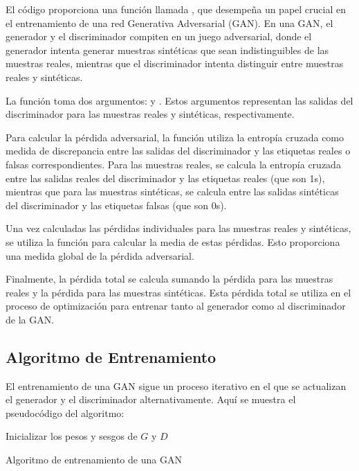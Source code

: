 El código proporciona una función llamada , que desempeña un papel crucial en el entrenamiento de una red Generativa Adversarial (GAN). En una GAN, el generador y el discriminador compiten en un juego adversarial, donde el generador intenta generar muestras sintéticas que sean indistinguibles de las muestras reales, mientras que el discriminador intenta distinguir entre muestras reales y sintéticas.


La función  toma dos argumentos:  y . Estos argumentos representan las salidas del discriminador para las muestras reales y sintéticas, respectivamente.

Para calcular la pérdida adversarial, la función utiliza la entropía cruzada como medida de discrepancia entre las salidas del discriminador y las etiquetas reales o falsas correspondientes. Para las muestras reales, se calcula la entropía cruzada entre las salidas reales del discriminador y las etiquetas reales (que son 1s), mientras que para las muestras sintéticas, se calcula entre las salidas sintéticas del discriminador y las etiquetas falsas (que son 0s).

Una vez calculadas las pérdidas individuales para las muestras reales y sintéticas, se utiliza la función  para calcular la media de estas pérdidas. Esto proporciona una medida global de la pérdida adversarial.

Finalmente, la pérdida total se calcula sumando la pérdida para las muestras reales y la pérdida para las muestras sintéticas. Esta pérdida total se utiliza en el proceso de optimización para entrenar tanto al generador como al discriminador de la GAN.

\subsection{Algoritmo de Entrenamiento}

El entrenamiento de una GAN sigue un proceso iterativo en el que se actualizan el generador y el discriminador alternativamente. Aquí se muestra el pseudocódigo del algoritmo:

\begin{algorithm}[H]
\SetAlgoLined
Inicializar los pesos y sesgos de \(G\) y \(D\) \\
\caption{Algoritmo de entrenamiento de una GAN}
\end{algorithm}

